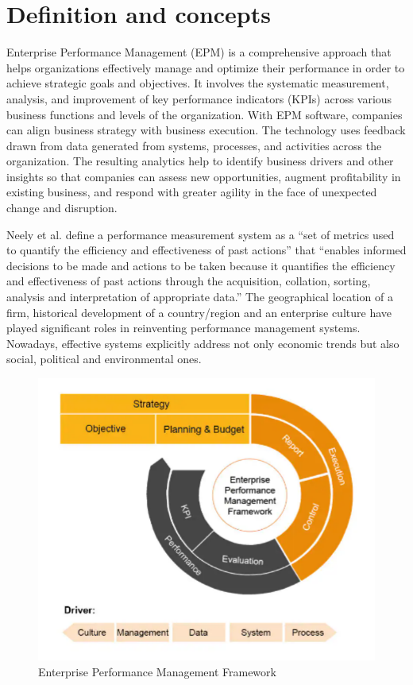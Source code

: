 \documentclass[12pt,a4paper,openright,twoside]{book}
\begin{document}
\section{Definition and concepts}

Enterprise Performance Management (EPM) is a comprehensive approach that helps organizations effectively manage and optimize their performance in order to achieve strategic goals and objectives. 
%
It involves the systematic measurement, analysis, and improvement of key performance indicators (KPIs) across various business functions and levels of the organization.
%
With EPM software, companies can align business strategy with business execution. 
%
The technology uses feedback drawn from data generated from systems, processes, and activities across the organization. 
%
The resulting analytics help to identify business drivers and other insights so that companies can assess new opportunities, augment profitability in existing business, and respond with greater agility in the face of unexpected change and disruption.

Neely et al. \cite{neely2002performance} define a performance measurement system as a ``set of metrics used to quantify the efficiency and effectiveness of past actions'' that ``enables informed decisions to be made and actions to be taken because it quantifies the efficiency and effectiveness of past actions through the acquisition, collation, sorting, analysis and interpretation of appropriate data.''
%
The geographical location of a firm, historical development of a country/region and an enterprise culture have played significant roles in reinventing performance management systems. 
%
Nowadays, effective systems explicitly address not only economic trends but also social, political and environmental ones.

\begin{figure}[h]
	\centering
	\includegraphics[]{figures/cycle.pdf}
	\caption{Enterprise Performance Management Framework}
	\label{fig:cycle}
\end{figure}
\end{document}
